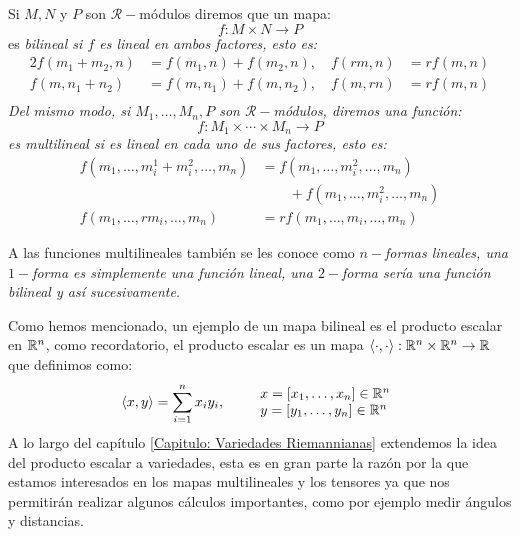\begin{definition}
	Si $M, N$ y $P$ son $\mathcal{R}-$módulos diremos que un mapa:
	\[
		f: M \times N \to P
	\]
	es \it{bilineal} si $f$ es lineal en ambos factores, esto es:
	\begin{alignat*}{2}
		f(m_1 + m_2, n) & = f(m_1,n) + f(m_2,n),\quad  f(rm,n) & = rf(m,n) \\
		f(m, n_1 + n_2) & = f(m,n_1) + f(m,n_2),\quad  f(m,rn) & = rf(m,n) \\
	\end{alignat*}
	Del mismo modo, si $M_1, \ldots, M_n, P$ son $\mathcal{R}-$módulos, diremos una función:
	\[
		f: M_1 \times \cdots \times M_n \to P
	\]
	es \it{multilineal} si es lineal en cada uno de sus factores, esto es:
	\begin{align*}
		f(m_1, \ldots, m_i^1 + m_i^2, \ldots, m_n) & = f(m_1, \ldots, m_i^2, \ldots, m_n)           \\
		                                           & \quad\quad +f(m_1, \ldots, m_i^2, \ldots, m_n) \\
		f(m_1,\ldots , rm_i, \ldots, m_n)          & = r f(m_1,\ldots,m_i,\ldots, m_n)
	\end{align*}
\end{definition}

A las funciones multilineales también se les conoce como \it{$n-$formas lineales}, una $1-$forma es simplemente una función lineal, una $2-$forma sería una función bilineal y así sucesivamente.

Como hemos mencionado, un ejemplo de un mapa bilineal es el producto escalar en $\mathbb{R}^n$, como recordatorio, el producto escalar es un mapa $\langle \cdot , \cdot \rangle: \mathbb{R}^n \times \mathbb{R}^n \to \mathbb{R}$ que definimos como:
\[
	\langle x,y \rangle = \sum_{i=1}^{n} x_i y_i, \quad\quad
	\begin{array}{l}
		x=[x_1,\dots,x_n] \in \mathbb{R}^n \\
		y=[y_1,\dots,y_n] \in \mathbb{R}^n
	\end{array}
\]
A lo largo del capítulo \ref{Capitulo: Variedades Riemannianas} extendemos la idea del producto escalar a variedades, esta es en gran parte la razón por la que estamos interesados en los mapas multilineales y los tensores ya que nos permitirán realizar algunos cálculos importantes, como por ejemplo medir ángulos y distancias.

